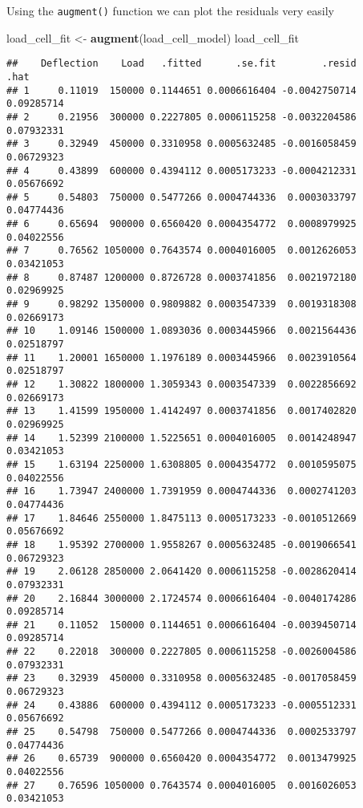 \documentclass[]{book}
\newenvironment{Shaded}{\begin{snugshade}}{\end{snugshade}}
\newcommand{\KeywordTok}[1]{\textcolor[rgb]{0.13,0.29,0.53}{\textbf{#1}}}
\newcommand{\NormalTok}[1]{#1}
\newcommand{\StringTok}[1]{\textcolor[rgb]{0.31,0.60,0.02}{#1}}
\theoremstyle{definition}
\theoremstyle{definition}
\theoremstyle{definition}
\theoremstyle{remark}
\begin{document}
Using the \texttt{augment()} function we can plot the residuals very
easily

\begin{Shaded}
\begin{Highlighting}[]
\NormalTok{load_cell_fit <-}\StringTok{ }\KeywordTok{augment}\NormalTok{(load_cell_model)}
\NormalTok{load_cell_fit}
\end{Highlighting}
\end{Shaded}

\begin{verbatim}
##    Deflection    Load   .fitted      .se.fit        .resid       .hat
## 1     0.11019  150000 0.1144651 0.0006616404 -0.0042750714 0.09285714
## 2     0.21956  300000 0.2227805 0.0006115258 -0.0032204586 0.07932331
## 3     0.32949  450000 0.3310958 0.0005632485 -0.0016058459 0.06729323
## 4     0.43899  600000 0.4394112 0.0005173233 -0.0004212331 0.05676692
## 5     0.54803  750000 0.5477266 0.0004744336  0.0003033797 0.04774436
## 6     0.65694  900000 0.6560420 0.0004354772  0.0008979925 0.04022556
## 7     0.76562 1050000 0.7643574 0.0004016005  0.0012626053 0.03421053
## 8     0.87487 1200000 0.8726728 0.0003741856  0.0021972180 0.02969925
## 9     0.98292 1350000 0.9809882 0.0003547339  0.0019318308 0.02669173
## 10    1.09146 1500000 1.0893036 0.0003445966  0.0021564436 0.02518797
## 11    1.20001 1650000 1.1976189 0.0003445966  0.0023910564 0.02518797
## 12    1.30822 1800000 1.3059343 0.0003547339  0.0022856692 0.02669173
## 13    1.41599 1950000 1.4142497 0.0003741856  0.0017402820 0.02969925
## 14    1.52399 2100000 1.5225651 0.0004016005  0.0014248947 0.03421053
## 15    1.63194 2250000 1.6308805 0.0004354772  0.0010595075 0.04022556
## 16    1.73947 2400000 1.7391959 0.0004744336  0.0002741203 0.04774436
## 17    1.84646 2550000 1.8475113 0.0005173233 -0.0010512669 0.05676692
## 18    1.95392 2700000 1.9558267 0.0005632485 -0.0019066541 0.06729323
## 19    2.06128 2850000 2.0641420 0.0006115258 -0.0028620414 0.07932331
## 20    2.16844 3000000 2.1724574 0.0006616404 -0.0040174286 0.09285714
## 21    0.11052  150000 0.1144651 0.0006616404 -0.0039450714 0.09285714
## 22    0.22018  300000 0.2227805 0.0006115258 -0.0026004586 0.07932331
## 23    0.32939  450000 0.3310958 0.0005632485 -0.0017058459 0.06729323
## 24    0.43886  600000 0.4394112 0.0005173233 -0.0005512331 0.05676692
## 25    0.54798  750000 0.5477266 0.0004744336  0.0002533797 0.04774436
## 26    0.65739  900000 0.6560420 0.0004354772  0.0013479925 0.04022556
## 27    0.76596 1050000 0.7643574 0.0004016005  0.0016026053 0.03421053

\end{verbatim}
\end{document}
